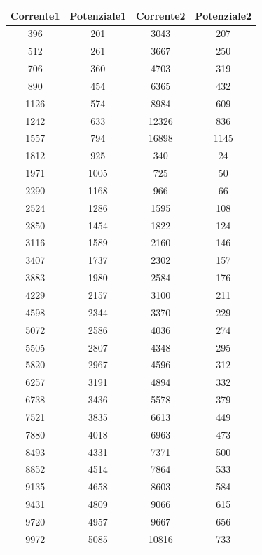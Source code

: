 \begin{center}
\begin{tabular}{*{4}{c}}
Corrente1 & Potenziale1 & Corrente2 & Potenziale2\\
\midrule
396 & 201 & 3043 & 207\\
512 & 261 & 3667 & 250\\
706 & 360 & 4703 & 319\\
890 & 454 & 6365 & 432\\
1126 & 574 & 8984 & 609\\
1242 & 633 & 12326 & 836\\
1557 & 794 & 16898 & 1145\\
1812 & 925 & 340 & 24\\
1971 & 1005 & 725 & 50\\
2290 & 1168 & 966 & 66\\
2524 & 1286 & 1595 & 108\\
2850 & 1454 & 1822 & 124\\
3116 & 1589 & 2160 & 146\\
3407 & 1737 & 2302 & 157\\
3883 & 1980 & 2584 & 176\\
4229 & 2157 & 3100 & 211\\
4598 & 2344 & 3370 & 229\\
5072 & 2586 & 4036 & 274\\
5505 & 2807 & 4348 & 295\\
5820 & 2967 & 4596 & 312\\
6257 & 3191 & 4894 & 332\\
6738 & 3436 & 5578 & 379\\
7521 & 3835 & 6613 & 449\\
7880 & 4018 & 6963 & 473\\
8493 & 4331 & 7371 & 500\\
8852 & 4514 & 7864 & 533\\
9135 & 4658 & 8603 & 584\\
9431 & 4809 & 9066 & 615\\
9720 & 4957 & 9667 & 656\\
9972 & 5085 & 10816 & 733\\

\end{tabular}
\end{center}


